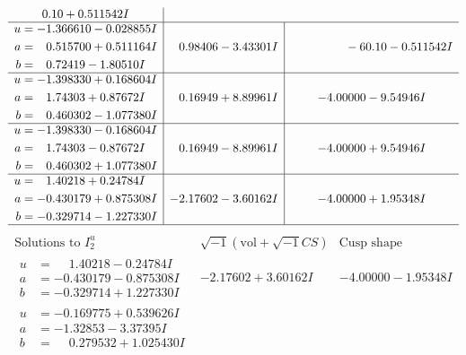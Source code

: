 \documentclass[1p]{elsarticle_modified}
\theoremstyle{definition}
\newcommand{\I}{\sqrt{-1}}
\begin{document}
$$\begin{array}{c|c|c}
0. 10   + 0.511542 I \\ \hline\begin{aligned}
u &= -1.366610 - 0.028855 I \\
a &= \phantom{-}0.515700 + 0.511164 I \\
b &= \phantom{-}0.72419 - 1.80510 I\end{aligned}
 & \phantom{-}0.98406 - 3.43301 I & \phantom{-0.000000 }      -6
0. 10   - 0.511542 I \\ \hline\begin{aligned}
u &= -1.398330 + 0.168604 I \\
a &= \phantom{-}1.74303 + 0.87672 I \\
b &= \phantom{-}0.460302 - 1.077380 I\end{aligned}
 & \phantom{-}0.16949 + 8.89961 I & -4.00000 - 9.54946 I \\ \hline\begin{aligned}
u &= -1.398330 - 0.168604 I \\
a &= \phantom{-}1.74303 - 0.87672 I \\
b &= \phantom{-}0.460302 + 1.077380 I\end{aligned}
 & \phantom{-}0.16949 - 8.89961 I & -4.00000 + 9.54946 I \\ \hline\begin{aligned}
u &= \phantom{-}1.40218 + 0.24784 I \\
a &= -0.430179 + 0.875308 I \\
b &= -0.329714 - 1.227330 I\end{aligned}
 & -2.17602 - 3.60162 I & -4.00000 + 1.95348 I\\
 \hline 
 \end{array}$$\newpage$$\begin{array}{c|c|c}  
\text{Solutions to }I^u_{2}& \I (\text{vol} + \sqrt{-1}CS) & \text{Cusp shape}\\
 \hline 
\begin{aligned}
u &= \phantom{-}1.40218 - 0.24784 I \\
a &= -0.430179 - 0.875308 I \\
b &= -0.329714 + 1.227330 I\end{aligned}
 & -2.17602 + 3.60162 I & -4.00000 - 1.95348 I \\ \hline\begin{aligned}
u &= -0.169775 + 0.539626 I \\
a &= -1.32853 - 3.37395 I \\
b &= \phantom{-}0.279532 + 1.025430 I\end{aligned}

\end{array}$$
\end{document}
